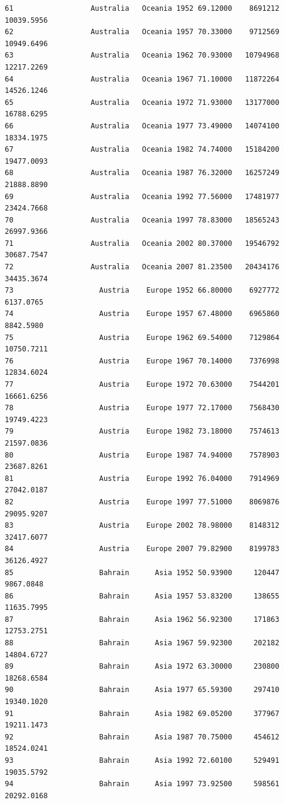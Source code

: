 \documentclass[
  letterpaper,
  DIV=11,
  numbers=noendperiod]{scrreprt}
\begin{document}
\begin{verbatim}
61                  Australia   Oceania 1952 69.12000    8691212  10039.5956
62                  Australia   Oceania 1957 70.33000    9712569  10949.6496
63                  Australia   Oceania 1962 70.93000   10794968  12217.2269
64                  Australia   Oceania 1967 71.10000   11872264  14526.1246
65                  Australia   Oceania 1972 71.93000   13177000  16788.6295
66                  Australia   Oceania 1977 73.49000   14074100  18334.1975
67                  Australia   Oceania 1982 74.74000   15184200  19477.0093
68                  Australia   Oceania 1987 76.32000   16257249  21888.8890
69                  Australia   Oceania 1992 77.56000   17481977  23424.7668
70                  Australia   Oceania 1997 78.83000   18565243  26997.9366
71                  Australia   Oceania 2002 80.37000   19546792  30687.7547
72                  Australia   Oceania 2007 81.23500   20434176  34435.3674
73                    Austria    Europe 1952 66.80000    6927772   6137.0765
74                    Austria    Europe 1957 67.48000    6965860   8842.5980
75                    Austria    Europe 1962 69.54000    7129864  10750.7211
76                    Austria    Europe 1967 70.14000    7376998  12834.6024
77                    Austria    Europe 1972 70.63000    7544201  16661.6256
78                    Austria    Europe 1977 72.17000    7568430  19749.4223
79                    Austria    Europe 1982 73.18000    7574613  21597.0836
80                    Austria    Europe 1987 74.94000    7578903  23687.8261
81                    Austria    Europe 1992 76.04000    7914969  27042.0187
82                    Austria    Europe 1997 77.51000    8069876  29095.9207
83                    Austria    Europe 2002 78.98000    8148312  32417.6077
84                    Austria    Europe 2007 79.82900    8199783  36126.4927
85                    Bahrain      Asia 1952 50.93900     120447   9867.0848
86                    Bahrain      Asia 1957 53.83200     138655  11635.7995
87                    Bahrain      Asia 1962 56.92300     171863  12753.2751
88                    Bahrain      Asia 1967 59.92300     202182  14804.6727
89                    Bahrain      Asia 1972 63.30000     230800  18268.6584
90                    Bahrain      Asia 1977 65.59300     297410  19340.1020
91                    Bahrain      Asia 1982 69.05200     377967  19211.1473
92                    Bahrain      Asia 1987 70.75000     454612  18524.0241
93                    Bahrain      Asia 1992 72.60100     529491  19035.5792
94                    Bahrain      Asia 1997 73.92500     598561  20292.0168

\end{verbatim}
\end{document}

